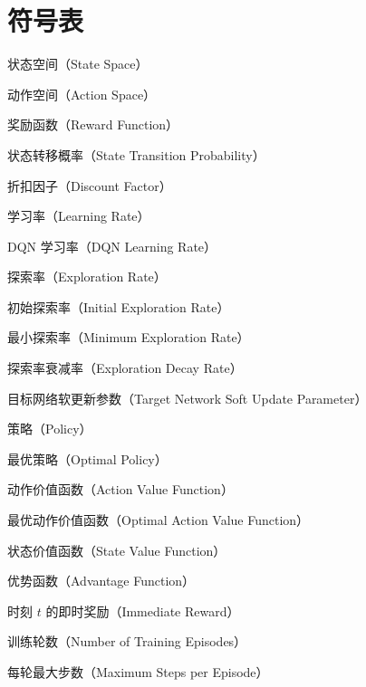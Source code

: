 
\chapter*{符号表}

\begin{description}[font=\normalfont\ttfamily,leftmargin=!,labelwidth=3cm]

\item[$\mathcal{S}$] 状态空间（State Space）
\item[$\mathcal{A}$] 动作空间（Action Space）
\item[$\mathcal{R}$] 奖励函数（Reward Function）
\item[$\mathcal{P}$] 状态转移概率（State Transition Probability）
\item[$\gamma$] 折扣因子（Discount Factor）
\item[$\alpha$] 学习率（Learning Rate）
\item[$\eta$] DQN 学习率（DQN Learning Rate）
\item[$\varepsilon$] 探索率（Exploration Rate）
\item[$\varepsilon_{\text{init}}$] 初始探索率（Initial Exploration Rate）
\item[$\varepsilon_{\text{min}}$] 最小探索率（Minimum Exploration Rate）
\item[$\varepsilon_{\text{decay}}$] 探索率衰减率（Exploration Decay Rate）
\item[$\tau$] 目标网络软更新参数（Target Network Soft Update Parameter）
\item[$\pi$] 策略（Policy）
\item[$\pi^*$] 最优策略（Optimal Policy）
\item[$Q(s, a)$] 动作价值函数（Action Value Function）
\item[$Q^*(s, a)$] 最优动作价值函数（Optimal Action Value Function）
\item[$V(s)$] 状态价值函数（State Value Function）
\item[$A(s, a)$] 优势函数（Advantage Function）
\item[$r_t$] 时刻 $t$ 的即时奖励（Immediate Reward）
\item[$n_{\text{episodes}}$] 训练轮数（Number of Training Episodes）
\item[$\text{max\_steps}$] 每轮最大步数（Maximum Steps per Episode）

\end{description}

